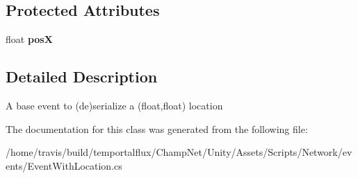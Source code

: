 \subsection*{Protected Attributes}
\begin{DoxyCompactItemize}
\item 
\hypertarget{class_event_with_location_a60216348b1c3955d7d1365aaffa80f4f}{float {\bfseries pos\-X}}\label{class_event_with_location_a60216348b1c3955d7d1365aaffa80f4f}

\end{DoxyCompactItemize}


\subsection{Detailed Description}
A base event to (de)serialize a (float,float) location 

The documentation for this class was generated from the following file\-:\begin{DoxyCompactItemize}
\item 
/home/travis/build/temportalflux/\-Champ\-Net/\-Unity/\-Assets/\-Scripts/\-Network/events/Event\-With\-Location.\-cs\end{DoxyCompactItemize}
